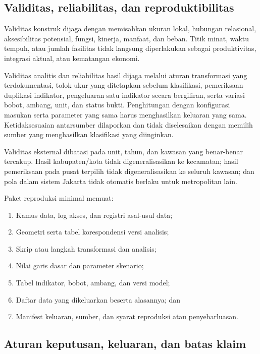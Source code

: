 \documentclass[11pt,a4paper,oneside,openany,indonesian]{report}
\begin{document}
\subsection{Validitas, reliabilitas, dan
reproduktibilitas}\label{validitas-reliabilitas-dan-reproduktibilitas}

Validitas konstruk dijaga dengan memisahkan ukuran lokal,
hubungan relasional, aksesibilitas potensial, fungsi, kinerja, manfaat,
dan beban. Titik minat, waktu tempuh, atau jumlah fasilitas tidak
langsung diperlakukan sebagai produktivitas, integrasi aktual, atau
kematangan ekonomi.

Validitas analitis dan reliabilitas hasil dijaga melalui aturan
transformasi yang terdokumentasi, tolok ukur yang ditetapkan sebelum
klasifikasi, pemeriksaan duplikasi indikator, pengeluaran satu indikator
secara bergiliran, serta variasi bobot, ambang, unit, dan status bukti.
Penghitungan dengan konfigurasi masukan serta parameter yang sama harus
menghasilkan keluaran yang sama. Ketidaksesuaian antarsumber dilaporkan
dan tidak diselesaikan dengan memilih sumber yang menghasilkan
klasifikasi yang diinginkan.

Validitas eksternal dibatasi pada unit, tahun, dan kawasan yang
benar-benar tercakup. Hasil kabupaten/kota tidak digeneralisasikan ke
kecamatan; hasil pemeriksaan pada pusat terpilih tidak digeneralisasikan
ke seluruh kawasan; dan pola dalam sistem Jakarta tidak otomatis berlaku
untuk metropolitan lain.

Paket reproduksi minimal memuat:

\begin{enumerate}
\def\labelenumi{\arabic{enumi}.}
\tightlist
\item
  Kamus data, log akses, dan registri asal-usul data;
\item
  Geometri serta tabel korespondensi versi analisis;
\item
  Skrip atau langkah transformasi dan analisis;
\item
  Nilai garis dasar dan parameter skenario;
\item
  Tabel indikator, bobot, ambang, dan versi model;
\item
  Daftar data yang dikeluarkan beserta alasannya; dan
\item
  Manifest keluaran, sumber, dan syarat reproduksi atau penyebarluasan.
\end{enumerate}

\subsection{Aturan keputusan, keluaran, dan batas
klaim}\label{aturan-keputusan-keluaran-dan-batas-klaim}
\end{document}
